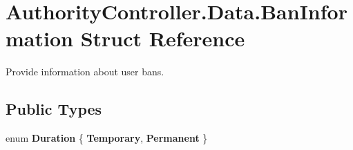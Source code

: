 \hypertarget{struct_authority_controller_1_1_data_1_1_ban_information}{}\section{Authority\+Controller.\+Data.\+Ban\+Information Struct Reference}
\label{struct_authority_controller_1_1_data_1_1_ban_information}


Provide information about user bans.  


\subsection*{Public Types}
\begin{DoxyCompactItemize}
\item 
\mbox{\label{struct_authority_controller_1_1_data_1_1_ban_information_a30799b8a5a9beb700177c66494927cb6}} 
enum {\bfseries Duration} \{ {\bfseries Temporary}, 
{\bfseries Permanent}
 \}
\end{DoxyCompactItemize}
